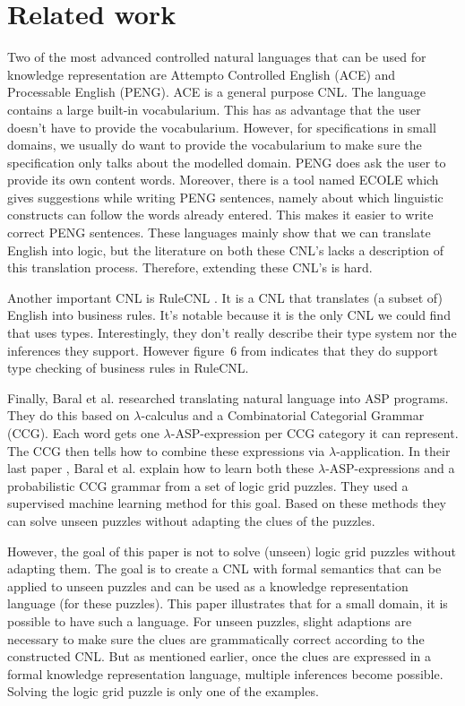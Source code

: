 \section{Related work}

Two of the most advanced controlled natural languages that can be used for knowledge representation are Attempto Controlled English (ACE) and Processable English (PENG). ACE \cite{Fuchs2008} is a general purpose CNL. The language contains a large built-in vocabularium. This has as advantage that the user doesn't have to provide the vocabularium. However, for specifications in small domains, we usually do want to provide the vocabularium to make sure the specification only talks about the modelled domain. PENG \cite{Schwitter2002} does ask the user to provide its own content words. Moreover, there is a tool named ECOLE which gives suggestions while writing PENG sentences, namely about which linguistic constructs can follow the words already entered. This makes it easier to write correct PENG sentences. These languages mainly show that we can translate English into logic, but the literature on both these CNL's lacks a description of this translation process. Therefore, extending these CNL's is hard.

Another important CNL is RuleCNL \cite{Njonko2014}. It is a CNL that translates (a subset of) English into business rules. It's notable because it is the only CNL we could find that uses types. Interestingly, they don't really describe their type system nor the inferences they support. However figure~6 from \cite{Njonko2014} indicates that they do support type checking of business rules in RuleCNL.

Finally, Baral et al. \cite{Baral2008, Baral2012, Baral2012a} researched translating natural language into ASP programs. They do this based on $\lambda$-calculus and a Combinatorial Categorial Grammar (CCG). Each word gets one $\lambda$-ASP-expression per CCG category it can represent. The CCG then tells how to combine these expressions via $\lambda$-application. In their last paper \cite{Baral2012a}, Baral et al. explain how to learn both these $\lambda$-ASP-expressions and a probabilistic CCG grammar from a set of logic grid puzzles. They used a supervised machine learning method for this goal. Based on these methods they can solve unseen puzzles without adapting the clues of the puzzles.

However, the goal of this paper is not to solve (unseen) logic grid puzzles without adapting them. The goal is to create a CNL with formal semantics that can be applied to unseen puzzles and can be used as a knowledge representation language (for these puzzles). This paper illustrates that for a small domain, it is possible to have such a language. For unseen puzzles, slight adaptions are necessary to make sure the clues are grammatically correct according to the constructed CNL. But as mentioned earlier, once the clues are expressed in a formal knowledge representation language, multiple inferences become possible. Solving the logic grid puzzle is only one of the examples.
